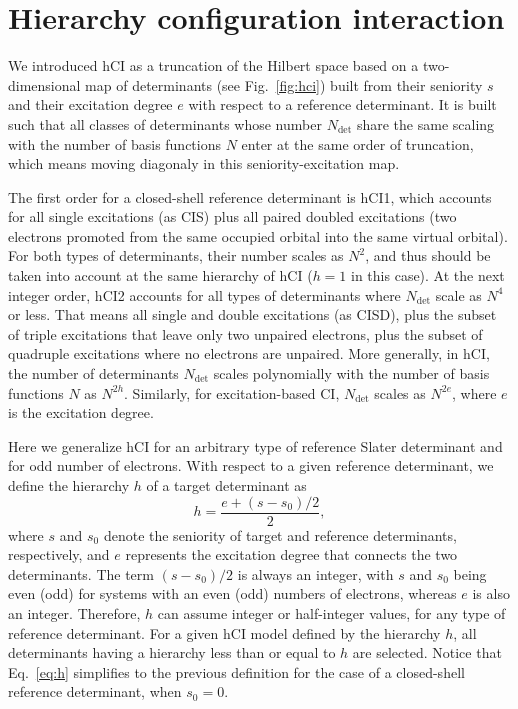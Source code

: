 \documentclass[aip,jcp,reprint,noshowkeys,superscriptaddress]{revtex4-1}
\newcommand{\Ndet}{N_\text{det}}
\begin{document}
\section{Hierarchy configuration interaction}
\label{sec:hCI}

We introduced hCI \cite{Kossoski_2022} as a truncation of the Hilbert space based on a two-dimensional map of determinants (see Fig.~\ref{fig:hci})
built from their seniority $s$ and their excitation degree $e$ with respect to a reference determinant.
It is built such that all classes of determinants whose number $\Ndet$ share the same scaling with the number of basis functions $N$ enter at the same order of truncation,
which means moving diagonaly in this seniority-excitation map.

The first order for a closed-shell reference determinant is hCI1, which accounts for all single excitations (as CIS) 
plus all paired doubled excitations (two electrons promoted from the same occupied orbital into the same virtual orbital).
For both types of determinants, their number scales as $N^2$, and thus should be taken into account at the same hierarchy of hCI ($h=1$ in this case).
At the next integer order, hCI2 accounts for all types of determinants where $\Ndet$ scale as $N^4$ or less.
That means all single and double excitations (as CISD), plus the subset of triple excitations that leave only two unpaired electrons, 
plus the subset of quadruple excitations where no electrons are unpaired.
More generally, in hCI, the number of determinants $\Ndet$ scales polynomially with the number of basis functions $N$ as $N^{2h}$.
Similarly, for excitation-based CI, $\Ndet$ scales as $N^{2e}$, where $e$ is the excitation degree.

Here we generalize hCI for an arbitrary type of reference Slater determinant and for odd number of electrons.
With respect to a given reference determinant, we define the hierarchy $h$ of a target determinant as
\begin{equation}
  \label{eq:h}
  h = \frac{e+ (s-s_0)/2}{2},
\end{equation}
where $s$ and $s_0$ denote the seniority of target and reference determinants, respectively, and $e$ represents the excitation degree that connects the two determinants.
The term $(s-s_0)/2$ is always an integer, with $s$ and $s_0$ being even (odd) for systems with an even (odd) numbers of electrons, whereas $e$ is also an integer.
Therefore, $h$ can assume integer or half-integer values, for any type of reference determinant.
For a given hCI model defined by the hierarchy $h$, all determinants having a hierarchy less than or equal to $h$ are selected.
Notice that Eq.~\eqref{eq:h} simplifies to the previous definition \cite{Kossoski_2022} for the case of a closed-shell reference determinant, when $s_0 = 0$.
\end{document}
